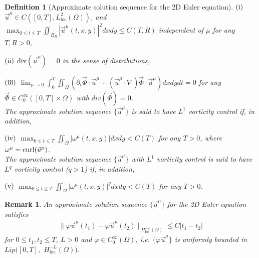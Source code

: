 \documentclass[1 [leqno, 11pt]{amsart}
\numberwithin{equation}{section}
\def\curl{\mathop{\rm curl}\nolimits}
\newtheorem{definition}[Theorem]{Definition}
\newtheorem{remark}[Theorem]{Remark}
\begin{document}
\begin{CJK*}{GBK}{song}
\begin{appendix}
\begin{definition} [Approximate solution sequence for the 2D Euler equation]
$(\rm{i})$  $\vec{u}^\mu\in C([0,T],L_{\text{loc}}^2(\Omega))$, and   $\max_{0\leq t\leq T}\iint_{B_R}|\vec{u}^\mu(t,x,y)|^2dxdy\leq C(T, R) $ independent of $\mu$ for any $T, R>0$,

$(\rm{ii})$ $\text{div}(\vec{u}^\mu)=0$ in the sense of distributions,

$(\rm{iii})$
$\lim_{\mu\to0}\int_0^T\iint_\Omega\left(\partial_t\vec{\Phi}\cdot \vec{u}^\mu+(\vec{u}^\mu\cdot\nabla)\vec{\Phi}\cdot\vec{u}^\mu\right)dxdydt=0$ for any $\vec{\Phi}\in C_0^\infty([0,T]\times\Omega)$ with $div(\vec{\Phi})=0$.
\\
The approximate solution sequence  $\{\vec{u}^\mu\}$ is said to have $L^1$ vorticity control if, in addition,

 $(\rm{iv})$ $\max_{0\leq t\leq T}\iint_{\Omega}|\omega^\mu(t,x,y)|dxdy<C(T)$ for any $T>0$, where $\omega^\mu=\curl(\vec{u}^\mu)$.\\
The approximate solution sequence  $\{\vec{u}^\mu\}$ with $L^1$ vorticity control  is said to have $L^q$ vorticity control ($q>1$) if, in addition,

$(\rm{v})$ $\max_{0\leq t\leq T}\iint_{\Omega}|\omega^\mu(t,x,y)|^qdxdy<C(T)$ for any $T>0$.
\end{definition}

\begin{remark}
An approximate solution sequence  $\{\vec{u}^\mu\}$  for the 2D Euler equation satisfies
\begin{align*}
\|\varphi\vec{u}^\mu(t_1)-\varphi\vec{u}^\mu(t_2)\|_{H_{\text{loc}}^{-L}(\Omega)}\leq C|t_1-t_2|
\end{align*}
for $0\leq t_1,t_2\leq T$, $L>0$ and $\varphi\in C_0^\infty(\Omega)$, i.e. $\{\varphi\vec{u}^\mu\}$ is uniformly bounded in $Lip([0,T],$ $H_{\text{loc}}^{-L}(\Omega))$.
\end{remark}



\end{appendix}
\end{CJK*}
\end{document}
